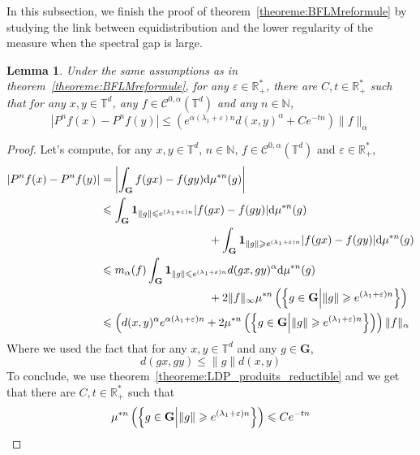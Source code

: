 \documentclass[11pt]{amsart}
\newtheorem{lemma}[theorem]{Lemma}
\theoremstyle{definition}
\theoremstyle{remark}
\numberwithin{equation}{section}
\begin{document}
In this subsection, we finish the proof of theorem~\ref{theoreme:BFLMreformule} by studying the link between equidistribution and the lower regularity of the measure when the spectral gap is large.

\begin{lemma} \label{lemme:normeholder}
Under the same assumptions as in theorem~\ref{theoreme:BFLMreformule}, for any $\varepsilon \in {\mathbb R}_+^\ast$, there are $C,t \in {\mathbb R}_+^\ast$ such that for any $x,y\in {\mathbb T}^d$, any $f\in \mathcal{C}^{0,\alpha}({\mathbb T}^d)$ and any $n\in {\mathbb N}$,
\[
|P^n f(x) - P^n f(y)| \leqslant \left( e^{\alpha(\lambda_1 + \varepsilon) n} d(x,y)^\alpha + Ce^{-tn} \right) \|f\|_\alpha
\]
\end{lemma}

\begin{proof}
Let's compute, for any $x,y\in {\mathbb T}^d$, $n\in {\mathbb N}$, $f\in \mathcal{C}^{0,\alpha}({\mathbb T}^d)$ and $\varepsilon \in {\mathbb R}_+^\ast$,
\begin{align*}
\left|P^n f(x) - P^n f(y) \right| &= \left|\int_{\mathbf G} f(gx) - f(gy) {{\rm d}}\mu^{\ast n}(g) \right| \\
&\leqslant \int_{\mathbf G} {\mathbf{1}}_{\|g\|\leqslant e^{(\lambda_1 + \varepsilon)n}} |f(gx) - f(gy)| {{\rm d}}\mu^{\ast n}(g) \\& {\hspace{1.7cm}}{\hspace{1.7cm}}+ \int_{\mathbf G} {\mathbf{1}}_{\|g\|\geqslant e^{(\lambda_1 + \varepsilon)n}} |f(gx) - f(gy)| {{\rm d}}\mu^{\ast n}(g) \\
& \leqslant m_\alpha(f) \int_{\mathbf G} {\mathbf{1}}_{\|g\|\leqslant e^{(\lambda_1 + \varepsilon)n}} d(gx,gy)^\alpha {{\rm d}}\mu^{\ast n}(g)\\& {\hspace{1.7cm}}{\hspace{1.7cm}} + 2\|f\|_\infty \mu^{\ast n} \left( \left\{ g\in {\mathbf G} \middle| \|g\|\geqslant e^{(\lambda_1 + \varepsilon)n} \right\}\right) \\
& \leqslant \left( d(x,y)^{\alpha} e^{\alpha(\lambda_1 + \varepsilon)n} + 2  \mu^{\ast n} \left( \left\{ g\in {\mathbf G} \middle| \|g\|\geqslant e^{(\lambda_1 + \varepsilon)n} \right\}\right) \right) \|f\|_\alpha
\end{align*}
Where we used the fact that for any $x,y\in {\mathbb T}^d$ and any $g\in {\mathbf G}$,
\[
d(gx,gy) \leqslant \|g\| d(x,y)
\]
To conclude, we use theorem~\ref{theoreme:LDP_produits_reductible} and we get that there are $C,t\in {\mathbb R}_+^\ast$ such that
\[
\mu^{\ast n} \left( \left\{ g\in {\mathbf G} \middle| \|g\|\geqslant e^{(\lambda_1 + \varepsilon)n} \right\}\right) \leqslant Ce^{-tn} \qedhere
\]
\end{proof}
\end{document}
